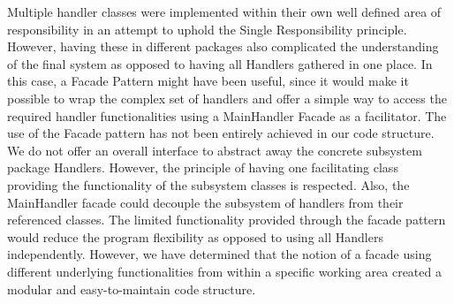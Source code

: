 Multiple handler classes were implemented within their own well defined area of responsibility in an attempt to uphold the Single Responsibility principle. However, having these in different packages also complicated the understanding of the final system as opposed to having all Handlers gathered in one place. 
In this case, a Facade Pattern might have been useful, since it would make it possible to wrap the complex set of handlers and offer a simple way to access the required handler functionalities using a MainHandler Facade as a facilitator.
The use of the Facade pattern has not been entirely achieved in our code structure. We do not offer an overall interface to abstract away the concrete subsystem package Handlers. However, the principle of having one facilitating class providing the functionality of the subsystem classes is respected.
Also, the MainHandler facade could decouple the subsystem of handlers from their referenced classes. 
The limited functionality provided through the facade pattern would reduce the program flexibility as opposed to using all Handlers independently. However, we have determined that the notion of a facade using different underlying functionalities from within a specific working area created a modular and easy-to-maintain code structure. 

